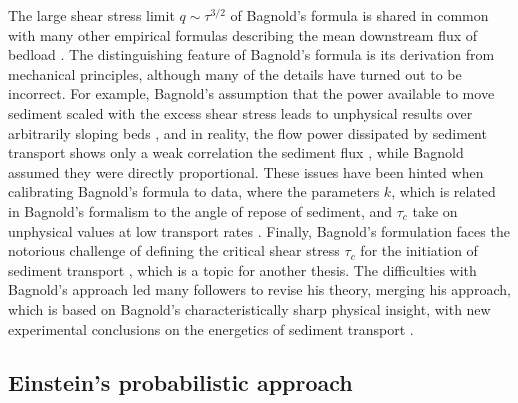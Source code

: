 The large shear stress limit $q \sim \tau^{3/2}$ of Bagnold's formula is shared in common with many other empirical formulas describing the mean downstream flux of bedload \citep[e.g.][]{MeyerPeter1948, Yalin1972, Wilcock2003, Parker1998}. The distinguishing feature of Bagnold's formula is its derivation from mechanical principles, although many of the details have turned out to be incorrect. For example, Bagnold's assumption that the power available to move sediment scaled with the excess shear stress leads to unphysical results over arbitrarily sloping beds \citep{Seminara2002}, and in reality, the flow power dissipated by sediment transport shows only a weak correlation the sediment flux \citep{Ancey2008}, while Bagnold assumed they were directly proportional. These issues have been hinted when calibrating Bagnold's formula to data, where the parameters $k$, which is related in Bagnold's formalism to the angle of repose of sediment, and $\tau_c$ take on unphysical values at low transport rates \citep{Nino1996}.
Finally, Bagnold's formulation faces the notorious challenge of defining the critical shear stress $\tau_c$ for the initiation of sediment transport \citep{Paintal1971,Kirchener1990,Houssais2015,Clark2017,Allen2018}, which is a topic for another thesis. 
The difficulties with Bagnold's approach led many followers to revise his theory, merging his approach, which is based on Bagnold's characteristically sharp physical insight, with new experimental conclusions on the energetics of sediment transport \citep{Engelund1976,Luque1976,Nino1998,Martin2000}.

\subsection{Einstein's probabilistic approach}

